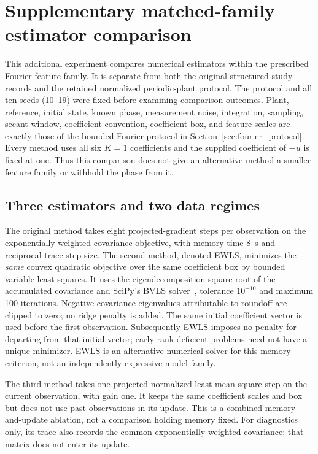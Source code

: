 \documentclass[journal]{IEEEtran}
\begin{document}
\section{Supplementary matched-family estimator comparison}
\label{sec:estimator_comparison}
This additional experiment compares numerical estimators within the prescribed
Fourier feature family. It is separate from both the original structured-study
records and the retained normalized periodic-plant protocol.
The protocol and all ten seeds (10--19) were fixed before examining comparison
outcomes. Plant, reference, initial state, known phase, measurement noise,
integration, sampling, secant window, coefficient convention, coefficient box,
and feature scales are exactly those of the bounded Fourier protocol in
Section~\ref{sec:fourier_protocol}. Every
method uses all six $K=1$ coefficients and the supplied coefficient of $-u$ is
fixed at one. Thus this comparison does not give an alternative method a smaller
feature family or withhold the phase from it.

\subsection{Three estimators and two data regimes}
The original method takes eight projected-gradient steps per observation on
the exponentially weighted covariance objective, with memory time $8$~s and
reciprocal-trace step size. The second method, denoted EWLS, minimizes the
\emph{same} convex quadratic objective over the same coefficient box by bounded
variable least squares. It uses the eigendecomposition square root of the
accumulated covariance and SciPy's BVLS solver~\cite{SciPyBVLS}, tolerance $10^{-10}$ and maximum
100 iterations. Negative covariance eigenvalues attributable to roundoff are
clipped to zero; no ridge penalty is added. The same initial coefficient vector
is used before the first observation. Subsequently EWLS imposes no penalty for
departing from that initial vector; early rank-deficient problems need not have
a unique minimizer. EWLS is an alternative numerical solver for this memory
criterion, not an independently expressive model family.

The third method takes one projected normalized least-mean-square step on the
current observation, with gain one. It keeps the same coefficient scales and
box but does not use past observations in its update. This is a combined
memory-and-update ablation, not a comparison holding memory fixed. For
diagnostics only, its trace also records the common exponentially weighted
covariance; that matrix does not enter its update.
\end{document}
